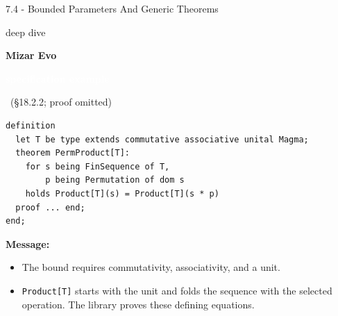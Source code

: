 \documentclass[aspectratio=169,11pt]{beamer}
\newcommand{\statusbadge}[2]{\colorbox{#1}{\textcolor{white}{\strut\scriptsize\sffamily\bfseries #2}}}
\newcommand{\badgeSpec}{\statusbadge{green!35!black}{specification example}}
\newcommand{\deepdivetag}{\hfill\colorbox{black!15}{\textcolor{black!65}{\strut\scriptsize\sffamily deep dive}}}
\begin{document}
\begin{frame}[fragile,t]{7.4 - Bounded Parameters And Generic Theorems\deepdivetag}
\smallskip
\textbf{Mizar Evo}~\badgeSpec~{\footnotesize(§18.2.2; proof omitted)}
\begin{lstlisting}[language={mizar},basicstyle=\ttfamily\footnotesize]
definition
  let T be type extends commutative associative unital Magma;
  theorem PermProduct[T]:
    for s being FinSequence of T,
        p being Permutation of dom s
    holds Product[T](s) = Product[T](s * p)
  proof ... end;
end;
\end{lstlisting}
\smallskip
\textbf{Message:}
\begin{itemize}
\setlength{\itemsep}{1pt}
\setlength{\parsep}{0pt}
\setlength{\parskip}{0pt}
\item The bound requires commutativity, associativity, and a unit.
\item \texttt{Product[T]} starts with the unit and folds the sequence with the selected operation. The library proves these defining equations.
\end{itemize}
\end{frame}
\end{document}
